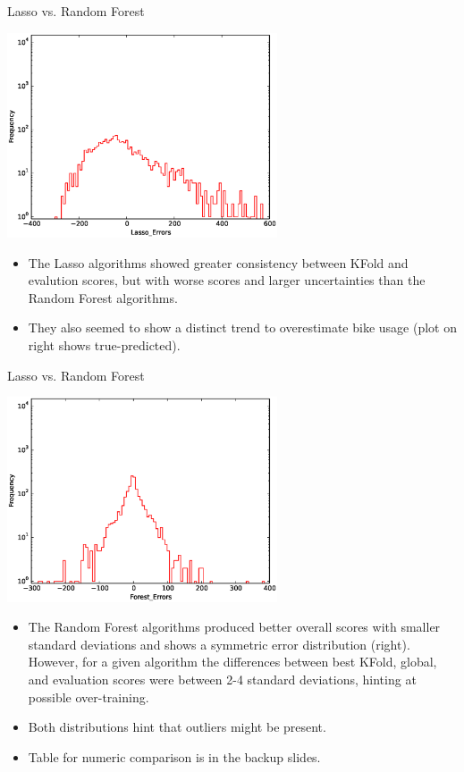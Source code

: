 \documentclass[pdf]{beamer}
\begin{document}
\begin{frame}{Lasso vs. Random Forest}
\begin{center}
\includegraphics[width=0.6\textwidth]{plots/Lasso_Errors_12.eps}\\
\end{center}
\begin{itemize}
\small
\item{The Lasso algorithms showed greater consistency between KFold and evalution scores, but with worse scores and larger uncertainties than the Random Forest algorithms.}
\item{They also seemed to show a distinct trend to overestimate bike usage (plot on right shows true-predicted).}
\end{itemize}
\end{frame}



\begin{frame}{Lasso vs. Random Forest}
\begin{center}
\includegraphics[width=0.6\textwidth]{plots/Forest_Errors_12.eps}
\end{center}
\begin{itemize}
\small
\item{The Random Forest algorithms produced better overall scores with smaller standard deviations and shows a symmetric error distribution (right).  However, for a given algorithm the differences between best KFold, global, and evaluation scores were between 2-4 standard deviations, hinting at possible over-training.}
\item{Both distributions hint that outliers might be present.}
\item{Table for numeric comparison is in the backup slides.}
\end{itemize}
\end{frame}
\end{document}
